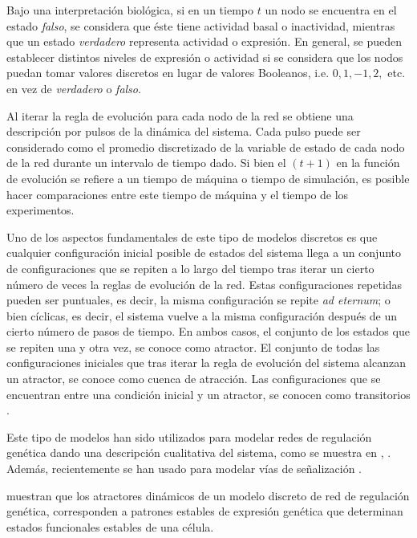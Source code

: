 Bajo una interpretación biológica, si en un tiempo $t$ un nodo se encuentra en el estado \emph{falso}, se considera que éste tiene actividad basal o inactividad, mientras que un estado \emph{verdadero} representa actividad o expresión. En general, se pueden establecer distintos niveles de expresión o actividad si se considera que los nodos puedan tomar valores discretos en lugar de valores Booleanos, i.e. $0, 1, -1, 2,$ etc. en vez de \emph{verdadero} o \emph{falso}.

Al iterar la regla de evolución para cada nodo de la red se obtiene una descripción por pulsos de la dinámica del sistema. Cada pulso puede ser considerado como el promedio discretizado de la variable de estado de cada nodo de la red durante un intervalo de tiempo dado. Si bien el $(t+1)$ en la función de evolución se refiere a un tiempo de máquina o tiempo de simulación, es posible hacer comparaciones entre este tiempo de máquina y el tiempo de los experimentos.

Uno de los aspectos fundamentales de este tipo de modelos discretos es que cualquier configuración inicial posible de estados del sistema llega a un conjunto de configuraciones que se repiten a lo largo del tiempo tras iterar un cierto número de veces la reglas de evolución de la red. Estas configuraciones repetidas pueden ser puntuales, es decir, la misma configuración se repite \emph{ad eternum}; o bien cíclicas, es decir, el sistema vuelve a la misma configuración después de un cierto número de pasos de tiempo. En ambos casos, el conjunto de los estados que se repiten una y otra vez, se conoce como atractor. El conjunto de todas las configuraciones iniciales que tras iterar la regla de evolución del sistema alcanzan un atractor, se conoce como cuenca de atracción. Las configuraciones que se encuentran entre una condición inicial y un atractor, se conocen como transitorios \citeauthor{Bornholdt:2005hg} \citep{Bornholdt:2005hg} \citeauthor{Gershenson:2004uq} \citep{Gershenson:2004uq}.


Este tipo de modelos han sido utilizados para modelar redes de regulación genética dando una descripción cualitativa del sistema, como se muestra en \citeauthor{EspinosaSoto:2004jr} \citep{EspinosaSoto:2004jr}, \citeauthor{Albert:2003vx} \citep{Albert:2003vx}. Además, recientemente se han usado para modelar vías de señalización \citeauthor{Morris:2010gb} \citep{Morris:2010gb}.


\citeauthor{huang2005} \citep{huang2005} muestran que los atractores din\'amicos de un modelo discreto de red de regulación genética, corresponden a patrones estables de expresi\'on gen\'etica que determinan estados funcionales estables de una c\'elula. 

